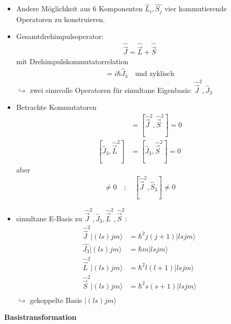 \documentclass[10pt,article,colorback,accentcolor=tud9d]{scrartcl}
\begin{document}
\begin{itemize}
  \item Andere Möglichkeit aus 6 Komponenten $\hat{L}_i,\hat{S_j}$ vier kommutierende Operatoren zu konstruieren.
  \item Gesamtdrehimpulsoperator:
    \begin{align}
    \hat{\vec{J}}=\hat{\vec{L}}+\hat{\vec{S}}
    \end{align}
    mit Drehimpulskommutatorrelation
    \begin{align}
    [\hat{J}_1,\hat{J}_2]=i\hbar\hat{J}_3\quad\text{und zyklisch}
    \end{align}
    $\hookrightarrow$ zwei sinnvolle Operatoren für simultane Eigenbasis: $\hat{\vec{J}}^2,\hat{J}_3$
  \item Betrachte Kommutatoren
    \begin{align}
    [\hat{\vec{J}}^2,\hat{\vec{L}}^2]&=[\hat{\vec{J}}^2,\hat{\vec{S}}^2]=0\\
    [\hat{J}_3,\hat{\vec{L}}^2]&=[\hat{J}_3,\hat{\vec{S}}^2]=0    
    \end{align}
    aber
    \begin{align}
    [\hat{\vec{J}}^2,\hat{L}_3]\neq0 \quad;\quad[\hat{\vec{J}}^2,\hat{S}_3]\neq0
    \end{align}
  \item simultane E-Basis zu $\hat{\vec{J}}^2,\hat{J}_3,\hat{\vec{L}}^2,\hat{\vec{S}}^2$:
    \begin{align}
    \hat{\vec{J}}^2|(ls)jm\rangle&=\hbar^2j(j+1)|lsjm\rangle\\
    \hat{J_3}|(ls)jm\rangle&=\hbar m|lsjm\rangle\\
    \hat{\vec{L}}^2|(ls)jm\rangle&=\hbar^2l(l+1)|lsjm\rangle\\
    \hat{\vec{S}}^2|(ls)jm\rangle&=\hbar^2s(s+1)|lsjm\rangle\\
    \end{align}
    $\hookrightarrow$ gekoppelte Basis $|(ls)jm\rangle$
\end{itemize}
\textbf{Basistransformation}
\end{document}

